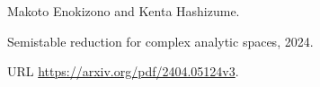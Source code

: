Makoto Enokizono and Kenta Hashizume.

\newblock Semistable reduction for complex analytic spaces, 2024.

\newblock URL \url{https://arxiv.org/pdf/2404.05124v3}.

